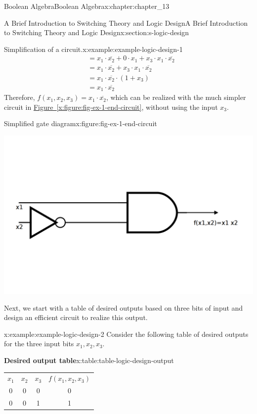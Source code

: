 \documentclass[oneside,10pt,]{book}
\newcommand{\tabularfont}{\relax}
\newcommand{\xreffont}{\relax}
\numberwithin{equation}{section}
\begin{document}
\begin{chapterptx}{Boolean Algebra}{}{Boolean Algebra}{}{}{x:chapter:chapter_13}
\begin{sectionptx}{A Brief Introduction to Switching Theory and Logic Design}{}{A Brief Introduction to Switching Theory and Logic Design}{}{}{x:section:s-logic-design}
\begin{example}{Simplification of a circuit.}{x:example:example-logic-design-1}
\begin{equation*}
\begin{split}
&= x_1\cdot  \overline{x_2} + 0 \cdot  x_1 + x_3 \cdot  x_1 \cdot  \overline{x_2}\\
&=x_1 \cdot  \overline{x_2} + x_3 \cdot  x_1 \cdot  \overline{x_2} \\
&= x_1 \cdot  \overline{x_2} \cdot  \left(1 + x_3\right)\\
&= x_1 \cdot  \overline{x_2}
\end{split}
\end{equation*}
Therefore, \(f\left(x_1, x_2, x_3\right)=x_1 \cdot  \overline{x_2}\), which can be realized with the much simpler circuit in \hyperref[x:figure:fig-ex-1-end-circuit]{Figure~{\xreffont\ref{x:figure:fig-ex-1-end-circuit}}}, without using the input \(x_3\).%
\begin{figureptx}{Simplified gate diagram}{x:figure:fig-ex-1-end-circuit}{}%
\begin{image}{0.2}{0.6}{0.2}%
\includegraphics[width=\linewidth]{images/fig-ex-1-end-circuit.png}
\end{image}%
\tcblower
\end{figureptx}%
\end{example}
Next, we start with a table of desired outputs based on three bits of input and design an efficient circuit to realize this output.%
\begin{example}{}{x:example:example-logic-design-2}%
Consider the following table of desired outputs for the three input bits \(x_1, x_2, x_3\).%
\begin{tableptx}{\textbf{Desired output table}}{x:table:table-logic-design-output}{}%
\centering
{\tabularfont%
\begin{tabular}{cccc}
\(x_1\)&\(x_2\)&\(x_3\)&\(f(x_1,x_2,x_3)\)\tabularnewline[0pt]
0&0&0&0\tabularnewline[0pt]
0&0&1&1\tabularnewline[0pt]

\end{tabular}}
\end{tableptx}
\end{example}
\end{sectionptx}
\end{chapterptx}
\end{document}
